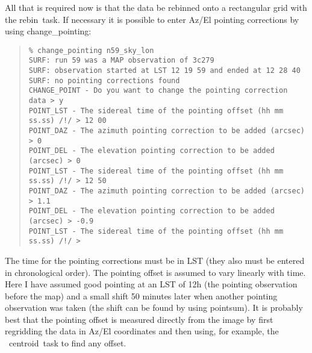 \documentclass[twoside,11pt]{article}
\newcommand{\Kappa}{\xref{{\sc{Kappa}}}{sun95}{}}
\newcommand{\task}[1]{{\sf #1}}
\newcommand{\rebin}{\htmlref{\task{rebin}}{REBIN}}
\newcommand{\chgpnt}{\htmlref{\task{change\_pointing}}{CHANGE_POINTING}}
\newcommand{\pointsum}{\htmlref{\task{pointsum}}{POINTSUM}}
\newcommand{\centroid}{\xref{\task{centroid}}{sun95}{CENTROID}}
\newenvironment{myquote}{\begin{quote}\begin{small}}{\end{small}\end{quote}}
\newcommand{\htmlref}[2]{#1}
\newcommand{\xref}[3]{#1}
\begin{document}
All that is required now is that the data be rebinned onto a rectangular grid
with the \rebin\ task. If necessary it is possible to enter Az/El pointing
corrections by using \chgpnt:

\begin{myquote}
\begin{verbatim}
% change_pointing n59_sky_lon
SURF: run 59 was a MAP observation of 3c279
SURF: observation started at LST 12 19 59 and ended at 12 28 40
SURF: no pointing corrections found
CHANGE_POINT - Do you want to change the pointing correction data > y
POINT_LST - The sidereal time of the pointing offset (hh mm ss.ss) /!/ > 12 00
POINT_DAZ - The azimuth pointing correction to be added (arcsec) > 0
POINT_DEL - The elevation pointing correction to be added (arcsec) > 0
POINT_LST - The sidereal time of the pointing offset (hh mm ss.ss) /!/ > 12 50
POINT_DAZ - The azimuth pointing correction to be added (arcsec) > 1.1
POINT_DEL - The elevation pointing correction to be added (arcsec) > -0.9
POINT_LST - The sidereal time of the pointing offset (hh mm ss.ss) /!/ > 
\end{verbatim}
\end{myquote}
The time for the pointing corrections must be in LST (they also must be
entered in chronological order). The pointing offset is assumed to vary
linearly with time. Here I have assumed good pointing at an LST of 12h
(the pointing observation before the map) and a small shift 50 minutes
later when another pointing observation was taken (the shift can be found
by using \pointsum). It is probably best that the pointing offset is 
measured directly from the image by first regridding the data in 
Az/El coordinates and then using, for example, the \Kappa\ \centroid\
task to find any offset.
\end{document}
